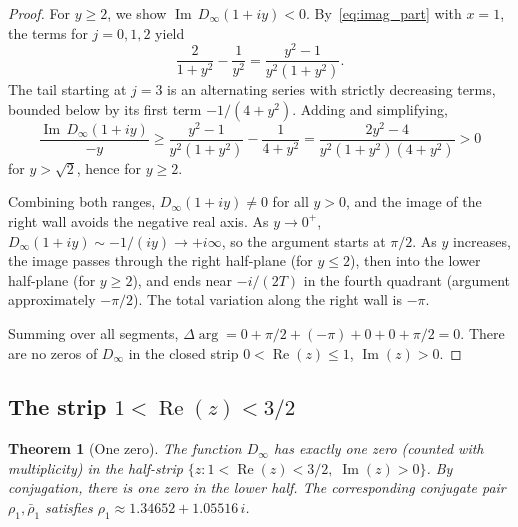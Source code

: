 \documentclass[11pt]{amsart}
\newtheorem{theorem}{Theorem}[section]
\theoremstyle{definition}
\theoremstyle{remark}
\newcommand{\Real}{\operatorname{Re}}
\newcommand{\Imag}{\operatorname{Im}}
\begin{document}
\begin{proof}
For $y \geq 2$, we show $\Imag\, D_\infty(1+iy) < 0$. By~\eqref{eq:imag_part} with $x = 1$, the terms for $j = 0,1,2$ yield
$$
\frac{2}{1+y^2} - \frac{1}{y^2} = \frac{y^2-1}{y^2(1+y^2)}.
$$
The tail starting at $j = 3$ is an alternating series with strictly decreasing terms, bounded below by its first term $-1/(4+y^2)$. Adding and simplifying,
$$
\frac{\Imag\, D_\infty(1+iy)}{-y} \geq \frac{y^2-1}{y^2(1+y^2)} - \frac{1}{4+y^2} = \frac{2y^2-4}{y^2(1+y^2)(4+y^2)} > 0
$$
for $y > \sqrt{2}$, hence for $y \geq 2$.

Combining both ranges, $D_\infty(1+iy) \neq 0$ for all $y > 0$, and the image of the right wall avoids the negative real axis. As $y \to 0^+$, $D_\infty(1+iy) \sim -1/(iy) \to +i\infty$, so the argument starts at $\pi/2$. As $y$ increases, the image passes through the right half-plane (for $y \leq 2$), then into the lower half-plane (for $y \geq 2$), and ends near $-i/(2T)$ in the fourth quadrant (argument approximately $-\pi/2$). The total variation along the right wall is $-\pi$.

Summing over all segments, $\Delta\arg = 0 + \pi/2 + (-\pi) + 0 + 0 + \pi/2 = 0$. There are no zeros of $D_\infty$ in the closed strip $0 < \Real(z) \leq 1$, $\Imag(z) > 0$.
\end{proof}


\subsection{The strip $1 < \Real(z) < 3/2$}

\begin{theorem}[One zero]\label{thm:one_zero}
The function $D_\infty$ has exactly one zero (counted with multiplicity) in the half-strip $\{z : 1 < \Real(z) < 3/2,\; \Imag(z) > 0\}$. By conjugation, there is one zero in the lower half. The corresponding conjugate pair $\rho_1, \bar\rho_1$ satisfies $\rho_1 \approx 1.34652 + 1.05516\,i$.
\end{theorem}
\end{document}

